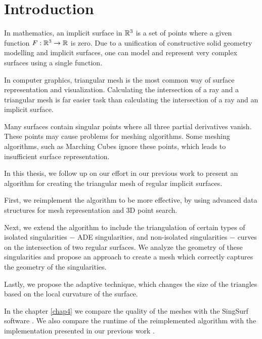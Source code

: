 \chapter*{Introduction} %

In mathematics, an implicit surface in $\mathbb{R}^3$ is a set of points where
a given function $F:\mathbb{R}^3 \to \mathbb{R}$ is zero. Due to a
unification of constructive solid geometry modelling and 
implicit surfaces, one can model and represent very 
complex surfaces using a single function.

In computer graphics, triangular mesh is the most common
way of surface representation and visualization. Calculating
the intersection of a ray and a triangular mesh is far 
easier task than calculating the intersection of a ray and
an implicit surface.

Many surfaces contain singular points where all three partial
derivatives vanish. These points may cause problems for
meshing algorithms. Some meshing algorithms, such as 
Marching Cubes \cite{lorensen1987marching} ignore these points,
which leads to insufficient surface representation.

In this thesis, we follow up on our effort in our previous work
\cite{korecova2021triangulation} to present an algorithm for
creating the triangular mesh of regular implicit surfaces.

First, we reimplement the algorithm to be more effective,
by using advanced data structures for mesh representation 
and 3D point search.

Next, we extend the algorithm to include the triangulation
of certain types of isolated singularities $-$ ADE singularities,
and non-isolated singularities $-$ curves on the intersection
of two regular surfaces.
We analyze the geometry of these singularities and propose 
an approach to create a mesh which correctly captures
the geometry of the singularities.

Lastly, we propose the adaptive technique, which changes the
size of the triangles based on the local curvature of the surface.

In the chapter \ref{chap4} we compare the quality of the meshes
with the SingSurf software \cite{morris2003client}. We also compare
the runtime of the reimplemented algorithm with the implementation
presented in our previous work \cite{korecova2021triangulation}. 